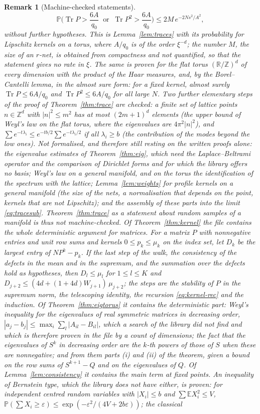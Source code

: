 \documentclass[11pt,a4paper]{article}
\theoremstyle{stmt}
\theoremstyle{defn}
\theoremstyle{rmk}
\newtheorem{remark}[theorem]{Remark}
\numberwithin{equation}{section}
\DeclareMathOperator{\Tr}{Tr}
\newcommand{\R}{\mathbb{R}}
\begin{document}
{\begin{remark}[Machine-checked statements]
\[
\mathbb P\Big(\Tr P>\frac{6A}{q_0}\ \text{ or }\ \Tr P^2>\frac{6A}{q_0}\Big)\le2M\,e^{-2Ns^2/A^2},
\]
without further hypotheses. This is Lemma~\ref{lem:traces} with its probability for Lipschitz kernels on a torus, where $A/q_0$ is of the order $\xi^{-d}$; the number $M$, the size of an $r$-net, is obtained from compactness and not quantified, so that the statement gives no rate in $\xi$. The same is proven for the flat torus $(\R/\mathbb Z)^d$ of every dimension with the product of the Haar measures, and, by the Borel--Cantelli lemma, in the almost sure form: for a fixed kernel, almost surely $\Tr P\le6A/q_0$ and $\Tr P^2\le6A/q_0$ for all large $N$. Two further elementary steps of the proof of Theorem~\ref{thm:trace} are checked: a finite set of lattice points $n\in\mathbb Z^d$ with $|n|^2\le m^2$ has at most $(2m+1)^d$ elements (the upper bound of Weyl's law on the flat torus, where the eigenvalues are $4\pi^2|n|^2$), and $\sum e^{-t\lambda_i}\le e^{-tb/2}\sum e^{-t\lambda_i/2}$ if all $\lambda_i\ge b$ (the contribution of the modes beyond the low ones). Not formalised, and therefore still resting on the written proofs alone: the eigenvalue estimates of Theorem~\ref{thm:eig}, which need the Laplace--Beltrami operator and the comparison of Dirichlet forms and for which the library offers no basis; Weyl's law on a general manifold, and on the torus the identification of the spectrum with the lattice; Lemma~\ref{lem:weights} for profile kernels on a general manifold (the size of the nets, a normalisation that depends on the point, kernels that are not Lipschitz); and the assembly of these parts into the limit \eqref{eq:tracesub}. Theorem~\ref{thm:trace} as a statement about random samples of a manifold is thus not machine-checked. Of Theorem~\ref{thm:kernel} the file contains the whole deterministic argument for matrices. For a matrix $P$ with nonnegative entries and unit row sums and kernels $0\le p_k\le\mu_k$ on the index set, let $D_k$ be the largest entry of $NP^k-p_k$. If the last step of the walk, the consistency of the defects in the mean and in the supremum, and the summation over the defects hold as hypotheses, then $D_l\le\mu_l$ for $1\le l\le K$ and $D_{j+2}\le(4d+(1+4d)W_{j+1})\,\mu_{j+2}$; the steps are the stability of $P$ in the supremum norm, the telescoping identity, the recursion \eqref{eq:kernel-rec} and the induction. Of Theorem~\ref{thm:eigtorus} it contains the deterministic part: Weyl's inequality for the eigenvalues of real symmetric matrices in decreasing order, $|a_j-b_j|\le\max_i\sum_l|A_{il}-B_{il}|$, which a search of the library did not find and which is therefore proven in the file by a count of dimensions; the fact that the eigenvalues of $S^k$ in decreasing order are the $k$-th powers of those of $S$ when these are nonnegative; and from them parts (i) and (ii) of the theorem, given a bound on the row sums of $S^{k+1}-Q$ and on the eigenvalues of $Q$. Of Lemma~\ref{lem:consistency} it contains the main term at fixed points. An inequality of Bernstein type, which the library does not have either, is proven: for independent centred random variables with $|X_i|\le b$ and $\sum\mathbb E X_i^2\le V$, $\mathbb P(\sum X_i\ge\varepsilon)\le\exp(-\varepsilon^2/(4V+2b\varepsilon))$; the classical 
\end{remark}}
\end{document}

